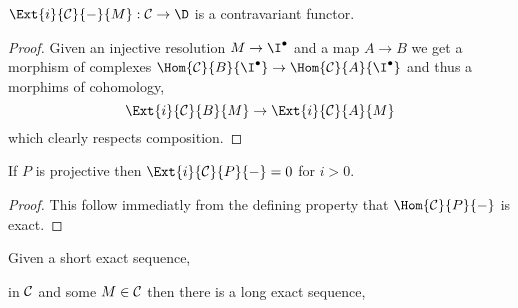 \documentclass[12pt]{article}
\begin{document}
\begin{lemma}
$\Ext{i}{\C}{-}{M} : \C \to \D$ is a contravariant functor. 
\end{lemma}

\begin{proof}
Given an injective resolution $M \to \I^\bullet$ and a map $A \to B$ we get a morphism of complexes $\Hom{\C}{B}{\I^\bullet} \to \Hom{\C}{A}{\I^\bullet}$ and thus a morphims of cohomology,
\[ \Ext{i}{\C}{B}{M} \to \Ext{i}{\C}{A}{M} \]
which clearly respects composition.
\end{proof}

\begin{lemma}
If $P$ is projective then $\Ext{i}{\C}{P}{-} = 0$ for $i > 0$.
\end{lemma}

\begin{proof}
This follow immediatly from the defining property that $\Hom{\C}{P}{-}$ is exact.
\end{proof}

\begin{prop}
Given a short exact sequence,
\begin{center}
\end{center}
in $\mathcal{C}$ and some $M \in \mathcal{C}$ then there is a long exact sequence, 
\begin{center}
\end{center}
\end{prop}
\end{document}
